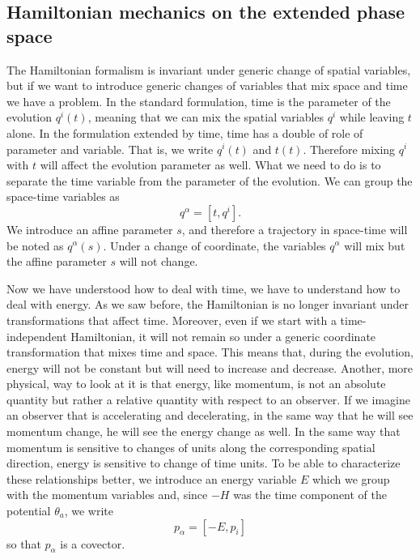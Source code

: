 \subsection{Hamiltonian mechanics on the extended phase space}


The Hamiltonian formalism is invariant under generic change of spatial variables, but if we want to introduce generic changes of variables that mix space and time we have a problem. In the standard formulation, time is the parameter of the evolution $q^i(t)$, meaning that we can mix the spatial variables $q^i$ while leaving $t$ alone. In the formulation extended by time, time has a double of role of parameter and variable. That is, we write $q^i(t)$ and $t(t)$. Therefore mixing $q^i$ with $t$ will affect the evolution parameter as well. What we need to do is to separate the time variable from the parameter of the evolution. We can group the space-time variables as
\begin{equation}
	q^\alpha = [t, q^i].
\end{equation}
We introduce an affine parameter $s$, and therefore a trajectory in space-time will be noted as $q^\alpha(s)$. Under a change of coordinate, the variables $q^\alpha$ will mix but the affine parameter $s$ will not change.

Now we have understood how to deal with time, we have to understand how to deal with energy. As we saw before, the Hamiltonian is no longer invariant under transformations that affect time. Moreover, even if we start with a time-independent Hamiltonian, it will not remain so under a generic coordinate transformation that mixes time and space. This means that, during the evolution, energy will not be constant but will need to increase and decrease. Another, more physical, way to look at it is that energy, like momentum, is not an absolute quantity but rather a relative quantity with respect to an observer. If we imagine an observer that is accelerating and decelerating, in the same way that he will see momentum change, he will see the energy change as well. In the same way that momentum is sensitive to changes of units along the corresponding spatial direction, energy is sensitive to change of time units. To be able to characterize these relationships better, we introduce an energy variable $E$ which we group with the momentum variables and, since $-H$ was the time component of the potential $\theta_a$, we write
\begin{equation}
	p_\alpha = [-E, p_i]
\end{equation}
so that $p_\alpha$ is a covector.

